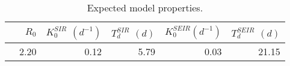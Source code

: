 \begin{table}[h!]
	\centering
	\caption{Expected model properties.}
	\label{tab:exp}
	\begin{tabular}{rrrrrr}
		\toprule
			& $R_0$ & $K^{SIR}_0$ $(d^{-1})$ & $T^{SIR}_d$ $(d)$ & $K^{SEIR}_0 $$(d^{-1})$  & $T^{SEIR}_d$ $(d)$\\
			\midrule
			 &  2.20 &        0.12 &        5.79 &         0.03 &        21.15 \\
			 \bottomrule
		 \end{tabular}
	 \end{table}
 
